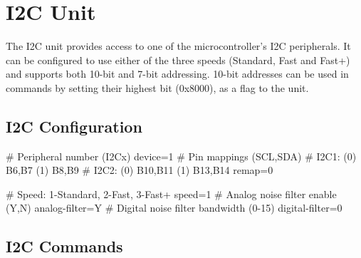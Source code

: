 \section{I2C Unit}

The I2C unit provides access to one of the microcontroller's I2C peripherals. It can be configured to use either of the three speeds (Standard, Fast and Fast+) and supports both 10-bit and 7-bit addressing. 10-bit addresses can be used in commands by setting their highest bit (0x8000), as a flag to the unit. 

\subsection{I2C Configuration}

\begin{inicode}
[I2C:d@4]
# Peripheral number (I2Cx)
device=1
# Pin mappings (SCL,SDA)
#  I2C1: (0) B6,B7    (1) B8,B9
#  I2C2: (0) B10,B11  (1) B13,B14
remap=0

# Speed: 1-Standard, 2-Fast, 3-Fast+
speed=1
# Analog noise filter enable (Y,N)
analog-filter=Y
# Digital noise filter bandwidth (0-15)
digital-filter=0
\end{inicode}

\subsection{I2C Commands}

